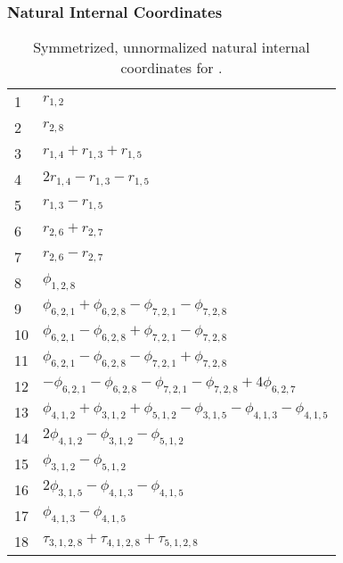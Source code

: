 \documentclass[10pt,oneside]{article}
\begin{document}
\clearpage

\subsubsection*{Natural Internal Coordinates}
\begin{table}[h!]
\centering
\caption{Symmetrized, unnormalized natural internal coordinates for .}
\small
\begin{tabular}{ll}
  1   & $r_{1,2}$ \\
  2   & $r_{2,8}$ \\
  3   & $r_{1,4} + r_{1,3} + r_{1,5}$ \\
  4   & $2r_{1,4} - r_{1,3} - r_{1,5}$ \\
  5   & $r_{1,3} - r_{1,5}$ \\
  6   & $r_{2,6} + r_{2,7}$ \\
  7   & $r_{2,6} - r_{2,7}$ \\
  8   & $\phi_{1,2,8}$ \\
  9   & $\phi_{6,2,1} + \phi_{6,2,8} - \phi_{7,2,1} - \phi_{7,2,8}$ \\
  10  & $\phi_{6,2,1} - \phi_{6,2,8} + \phi_{7,2,1} - \phi_{7,2,8}$ \\
  11  & $\phi_{6,2,1} - \phi_{6,2,8} - \phi_{7,2,1} + \phi_{7,2,8}$ \\
  12  & $-\phi_{6,2,1} - \phi_{6,2,8} - \phi_{7,2,1} - \phi_{7,2,8} + 4\phi_{6,2,7}$ \\
  13  & $\phi_{4,1,2} + \phi_{3,1,2} + \phi_{5,1,2} - \phi_{3,1,5} - \phi_{4,1,3} - \phi_{4,1,5}$ \\
  14  & $2\phi_{4,1,2} - \phi_{3,1,2} - \phi_{5,1,2}$ \\
  15  & $\phi_{3,1,2} - \phi_{5,1,2}$ \\
  16  & $2\phi_{3,1,5} - \phi_{4,1,3} - \phi_{4,1,5}$ \\
  17  & $\phi_{4,1,3} - \phi_{4,1,5}$ \\
  18  & $\tau_{3,1,2,8} + \tau_{4,1,2,8} + \tau_{5,1,2,8}$ \\
\end{tabular}
\end{table}

\clearpage

\subsection{\ \ \ }
\end{document}
